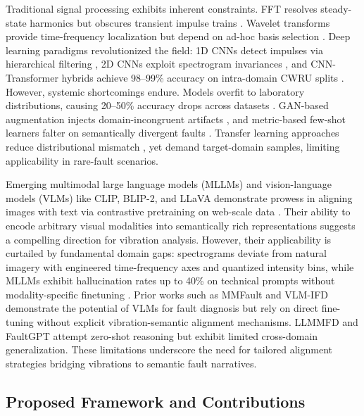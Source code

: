 Traditional signal processing exhibits inherent constraints. FFT resolves steady-state harmonics but obscures transient impulse trains \cite{cite10}. Wavelet transforms provide time-frequency localization but depend on ad-hoc basis selection \cite{cite11}. Deep learning paradigms revolutionized the field: 1D CNNs detect impulses via hierarchical filtering \cite{cite12}, 2D CNNs exploit spectrogram invariances \cite{cite13}, and CNN-Transformer hybrids achieve 98--99\% accuracy on intra-domain CWRU splits \cite{cite15}. However, systemic shortcomings endure. Models overfit to laboratory distributions, causing 20--50\% accuracy drops across datasets \cite{cite17}. GAN-based augmentation injects domain-incongruent artifacts \cite{cite18}, and metric-based few-shot learners falter on semantically divergent faults \cite{cite19}. Transfer learning approaches reduce distributional mismatch \cite{cite25}, yet demand target-domain samples, limiting applicability in rare-fault scenarios.

Emerging multimodal large language models (MLLMs) and vision-language models (VLMs) like CLIP, BLIP-2, and LLaVA demonstrate prowess in aligning images with text via contrastive pretraining on web-scale data \cite{cite20}\cite{cite21}. Their ability to encode arbitrary visual modalities into semantically rich representations suggests a compelling direction for vibration analysis. However, their applicability is curtailed by fundamental domain gaps: spectrograms deviate from natural imagery with engineered time-frequency axes and quantized intensity bins, while MLLMs exhibit hallucination rates up to 40\% on technical prompts without modality-specific finetuning \cite{cite27}\cite{cite28}\cite{cite29}. Prior works such as MMFault \cite{cite23} and VLM-IFD \cite{cite24} demonstrate the potential of VLMs for fault diagnosis but rely on direct fine-tuning without explicit vibration-semantic alignment mechanisms. LLMMFD \cite{cite25} and FaultGPT \cite{cite26} attempt zero-shot reasoning but exhibit limited cross-domain generalization. These limitations underscore the need for tailored alignment strategies bridging vibrations to semantic fault narratives.

\subsection*{Proposed Framework and Contributions}

